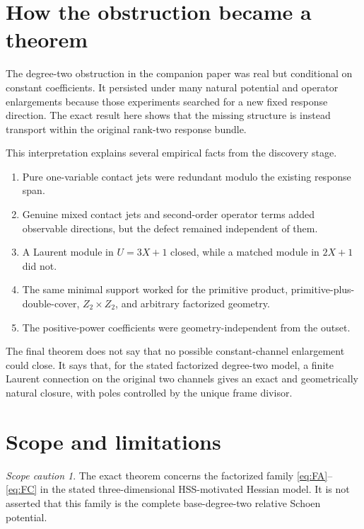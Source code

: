 \documentclass[11pt]{article}
\theoremstyle{definition}
\theoremstyle{remark}
\newtheorem{caution}[theorem]{Scope caution}
\begin{document}
\section{How the obstruction became a theorem}

The degree-two obstruction in the companion paper was real but conditional on constant coefficients.  It persisted under many natural potential and operator enlargements because those experiments searched for a new fixed response direction.  The exact result here shows that the missing structure is instead transport within the original rank-two response bundle.

This interpretation explains several empirical facts from the discovery stage.

\begin{enumerate}[label=\arabic*.]
 \item Pure one-variable contact jets were redundant modulo the existing response span.
 \item Genuine mixed contact jets and second-order operator terms added observable directions, but the defect remained independent of them.
 \item A Laurent module in $U=3X+1$ closed, while a matched module in $2X+1$ did not.
 \item The same minimal support worked for the primitive product, primitive-plus-double-cover, $Z_2\times Z_2$, and arbitrary factorized geometry.
 \item The positive-power coefficients were geometry-independent from the outset.
\end{enumerate}

The final theorem does not say that no possible constant-channel enlargement could close.  It says that, for the stated factorized degree-two model, a finite Laurent connection on the original two channels gives an exact and geometrically natural closure, with poles controlled by the unique frame divisor.

\section{Scope and limitations}

\begin{caution}
The exact theorem concerns the factorized family \eqref{eq:FA}--\eqref{eq:FC} in the stated three-dimensional HSS-motivated Hessian model.  It is not asserted that this family is the complete base-degree-two relative Schoen potential.
\end{caution}
\end{document}
